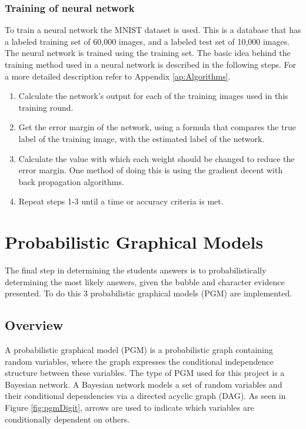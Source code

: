 \subsubsection{Training of neural network}
\label{sec:trainNN}

To train a neural network the MNIST dataset is used. This is a database that has a labeled training set of 60,000 images, and a labeled test set of 10,000 images. The neural network is trained using the training set. The basic idea behind the training method used in a neural network is described in the following steps. For a more detailed description refer to Appendix \ref{ap:Algorithms}.

\begin{enumerate}
\item Calculate the network's output for each of the training images used in this training round.
\item Get the error margin of the network, using a formula that compares the true label of the training image, with the estimated label of the network.
\item Calculate the value with which each weight should be changed to reduce the error margin. One method of doing this is using the gradient decent with back propagation algorithms.
\item Repeat steps 1-3 until a time or accuracy criteria is met.
\end{enumerate}

\section{Probabilistic Graphical Models}
\label{sec:PGM}

The final step in determining the students answers is to probabilistically determining the most likely answers, given the bubble and character evidence presented. To do this 3 probabilistic graphical models (PGM) are implemented.

\subsection{Overview}

A probabilistic graphical model (PGM) is a probabilistic graph containing random variables, where the graph expresses the conditional independence structure between these variables. The type of PGM used for this project is a Bayesian network. A Bayesian network models a set of random variables and their conditional dependencies via a directed acyclic graph (DAG). As seen in Figure \ref{fig:pgmDigit}, arrows are used to indicate which variables are conditionally dependent on others. 

